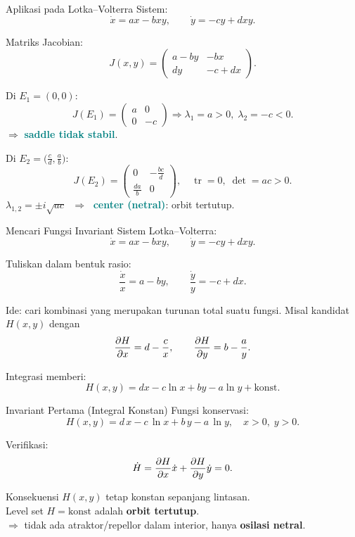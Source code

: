\documentclass[aspectratio=32]{beamer}
\newcommand{\jsg}[1]{\textcolor{teal}{\textbf{#1}}}
\begin{document}
\begin{frame}{Aplikasi pada Lotka–Volterra}
  \small
  Sistem:
  \[
    \dot{x} = ax - bxy, \qquad 
    \dot{y} = -cy + dxy.
  \]

  Matriks Jacobian:
  \[
    J(x,y)=
    \begin{pmatrix}
      a - by & -bx \\
      dy & -c + dx
    \end{pmatrix}.
  \]

  \vspace{0.5em}
  Di $E_1=(0,0)$:
  \[
    J(E_1)=
    \begin{pmatrix} a & 0 \\ 0 & -c \end{pmatrix}
    \Rightarrow \lambda_1=a>0, \;\lambda_2=-c<0.
  \]
  $\Rightarrow$ \jsg{saddle tidak stabil}.

  \vspace{0.5em}
  Di $E_2=\big(\tfrac{c}{d},\tfrac{a}{b}\big)$:
  \[
    J(E_2)=
    \begin{pmatrix}
      0 & -\tfrac{bc}{d} \\
      \tfrac{da}{b} & 0
    \end{pmatrix}, \quad
    \operatorname{tr}=0,\;\det=ac>0.
  \]
  $\lambda_{1,2}=\pm i\sqrt{ac}$ $\;\Rightarrow\;$ \jsg{center (netral)}: orbit tertutup.
\end{frame}

\begin{frame}{Mencari Fungsi Invariant}
  \small
  Sistem Lotka–Volterra:
  \[
  \dot{x} = ax - bxy, \qquad \dot{y} = -cy + dxy.
  \]

  \vspace{0.5em}
  Tuliskan dalam bentuk rasio:
  \[
  \frac{\dot{x}}{x} = a - b y, 
  \qquad 
  \frac{\dot{y}}{y} = -c + d x.
  \]

  \vspace{0.5em}
  Ide: cari kombinasi yang merupakan turunan total suatu fungsi.
  Misal kandidat $H(x,y)$ dengan
  \[
    \pdv{H}{x} = d - \frac{c}{x}, 
    \qquad
    \pdv{H}{y} = b - \frac{a}{y}.
  \]

  \vspace{0.5em}
  Integrasi memberi:
  \[
    H(x,y) = d x - c \ln x + b y - a \ln y + \text{konst}.
  \]
\end{frame}

\begin{frame}{Invariant Pertama (Integral Konstan)}
  \small
  Fungsi konservasi:
  \[
  H(x,y)=d\,x- c\,\ln x + b\,y - a\,\ln y,\quad x>0,\;y>0.
  \]

  \vspace{0.5em}
  Verifikasi:
  \[
  \dot{H} = \pdv{H}{x}\dot{x} + \pdv{H}{y}\dot{y} = 0.
  \]

  \vspace{0.5em}
  \begin{block}{Konsekuensi}
    $H(x,y)$ tetap konstan sepanjang lintasan.\\
    Level set $H=\text{konst}$ adalah \textbf{orbit tertutup}.\\
    $\Rightarrow$ tidak ada atraktor/repellor dalam interior, hanya \textbf{osilasi netral}.
  \end{block}
\end{frame}
\end{document}
